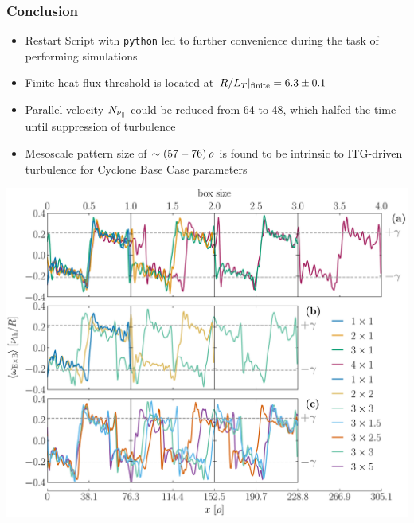 \documentclass[compress,aspectratio=1610,noflama]{beamer}
\begin{document}
	\begin{frame}
		\frametitle{Conclusion}
		
		\begin{minipage}{0.4\paperwidth}\raggedleft
			\begin{itemize}
				\item <2-> Restart Script with \texttt{python} led to further convenience during the task of performing simulations
				\item <3-> Finite heat flux threshold is located at $R/L_T|_\mathrm{finite} = 6.3 \pm 0.1$
				\item <4-> Parallel velocity $N_{\nu_\parallel}$ could be reduced from 64 to 48, which halfed the time until suppression of turbulence
				\item <5-> Mesoscale pattern size of $\sim (57 - 76)\,\rho$ is found to be intrinsic to ITG-driven turbulence for Cyclone Base Case parameters
			\end{itemize}
		\end{minipage}
		\begin{minipage}{0.4\paperwidth}
			 \includegraphics[width = 0.5\paperwidth]{Comparison/Boxsize/S6_rlt6.0_boxsize1-2-3-4x1-1.5-2-2.5-3-5_Ns16_Nvpar48_Nmu9_wexb_comparison_thesis.pdf}
		\end{minipage}
	\end{frame}

\end{document}
